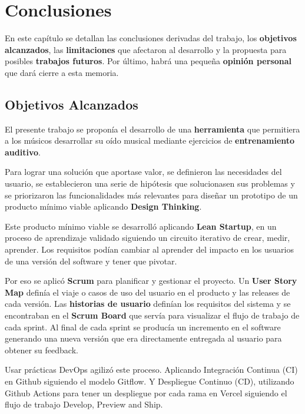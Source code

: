 \documentclass[12pt,twoside,titlepage]{report}
\begin{document}
{\newpage

\chapter{Conclusiones}

En este capítulo se detallan las conclusiones derivadas del trabajo, los \textbf{objetivos alcanzados}, las \textbf{limitaciones} que afectaron al desarrollo y la propuesta para posibles \textbf{trabajos futuros}. Por último, habrá una pequeña \textbf{opinión personal} que dará cierre a esta memoria.
\section{Objetivos Alcanzados}

El presente trabajo se proponía el desarrollo de una \textbf{herramienta} que permitiera a los músicos desarrollar su oído musical mediante ejercicios de \textbf{entrenamiento auditivo}.

Para lograr una solución que aportase valor, se definieron las necesidades del usuario, se establecieron una serie de hipótesis que solucionasen sus problemas y se priorizaron las funcionalidades más relevantes para diseñar un prototipo de un producto mínimo viable aplicando \textbf{Design Thinking}.

Este producto mínimo viable se desarrolló aplicando \textbf{Lean Startup}, en un proceso de aprendizaje validado siguiendo un circuito iterativo de crear, medir, aprender. Los requisitos podían cambiar al aprender del impacto en los usuarios de una versión del software y tener que pivotar.

Por eso se aplicó \textbf{Scrum} para planificar y gestionar el proyecto. Un \textbf{User Story Map} definía el viaje o casos de uso del usuario en el producto y las releases de cada versión. Las \textbf{historias de usuario} definían los requisitos del sistema y se encontraban en el \textbf{Scrum Board} que servía para visualizar el flujo de trabajo de cada sprint. Al final de cada sprint se producía un incremento en el software generando una nueva versión que era directamente entregada al usuario para obtener su feedback.

Usar prácticas DevOps agilizó este proceso. Aplicando Integración Continua (CI) en Github siguiendo el modelo Gitflow. Y Despliegue Continuo (CD), utilizando Github Actions para tener un despliegue por cada rama en Vercel siguiendo el flujo de trabajo Develop, Preview and Ship.

}
\end{document}
